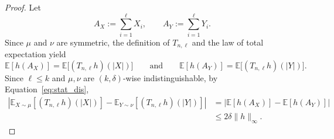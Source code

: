 \documentclass[manuscript,nonacm]{acmart}
\begin{document}
\begin{proof}
Let
\[
    A_X:=\sum_{i=1}^{\ell} X_i,
    \qquad
    A_Y:=\sum_{i=1}^{\ell} Y_i.
\]
Since \(\mu\) and \(\nu\) are symmetric, the definition of \(T_{n,\ell}\) and the law of total
expectation yield
\[
    \mathbb{E}[h(A_X)]
    =
    \mathbb{E}\bigl[(T_{n,\ell}h)(\lvert X\rvert)\bigr]
    \qquad\text{and}\qquad
    \mathbb{E}[h(A_Y)]
    =
    \mathbb{E}\bigl[(T_{n,\ell}h)(\lvert Y\rvert)\bigr].
\]
Since \(\ell\le k\) and \(\mu,\nu\) are \((k,\delta)\)-wise
indistinguishable, by Equation~\ref{eq:stat_dis},
\[
\begin{aligned}
    \left|
        \mathbb E_{X\sim\mu}[(T_{n,\ell}h)(|X|)]
        -
        \mathbb E_{Y\sim\nu}[(T_{n,\ell}h)(|Y|)]
    \right|
    &=
    \left|
        \mathbb E[h(A_X)]
        -
        \mathbb E[h(A_Y)]
    \right| \\
    &\le
    2\delta\|h\|_\infty.
\end{aligned}
\]
\end{proof}
\end{document}
